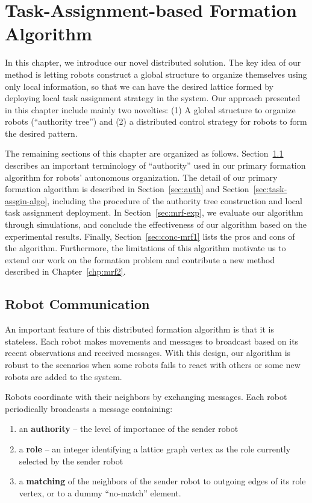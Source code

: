 \chapter{Task-Assignment-based Formation Algorithm}
\label{chp:mrf1}
In this chapter, we introduce our novel distributed solution. 
%
The key idea of our method is letting robots construct a global structure to
organize themselves using only local information, so that we can have the
desired lattice formed by deploying local task assignment strategy in the system. 
%
Our approach presented in this chapter include mainly two novelties: (1) A
global structure to organize robots (``authority tree'') and (2) a distributed
control strategy for robots to form the desired pattern.


%
The remaining sections of this chapter are organized as follows. 
%
Section~\ref{sec:msg1} describes an important terminology of ``authority'' used in our primary formation algorithm for robots' autonomous organization.
%
The detail of our primary formation algorithm is described in Section~\ref{sec:auth} and Section~\ref{sec:task-assgin-algo}, including the
procedure of the authority tree construction and local task assignment deployment. 
%
In Section~\ref{sec:mrf-exp}, we evaluate our algorithm through simulations, 
and conclude the effectiveness of our algorithm based on the experimental results. 
%
Finally, Section~\ref{sec:conc-mrf1} lists the pros and cons of the algorithm. 
Furthermore, the limitations of this algorithm motivate us to extend our work on the formation problem and contribute a new method described in Chapter~\ref{chp:mrf2}.

\section{Robot Communication}
\label{sec:msg1}
An important feature of this distributed formation algorithm is that it is stateless.
%
Each robot makes movements and messages to broadcast based on its recent observations and received messages.
%
With this design, our algorithm is robust to the scenarios when some robots fails to react with others or some new robots are added to the system.

Robots coordinate with their neighbors by exchanging messages. 
%
Each robot periodically broadcasts a message containing:
  \begin{enumerate}
  \item an \textbf{authority} -- the level of importance of the sender robot
  \item a \textbf{role} -- an integer identifying a lattice graph vertex as the role currently selected by the sender robot
  \item a \textbf{matching} of the neighbors of the sender robot to outgoing edges of its
  role vertex, or to a dummy ``no-match'' element.
 \end{enumerate}

